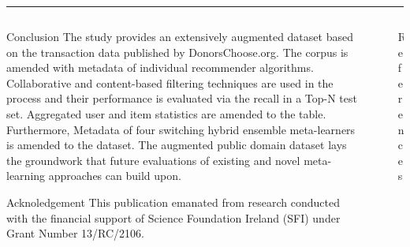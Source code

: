 \documentclass[final]{beamer}
\begin{document}
\begin{frame}[t,fragile=singleslide]{}
	\begin{columns}[t]
		\begin{column}{0.945\textwidth}
			\color{gray}
			\vspace{0.5em}
			\hrule{}
			\vspace{0.5em}
		\end{column}
	\end{columns}

	\begin{columns}[t]
		\begin{column}{0.45\textwidth}
			\begin{block}{Conclusion}
				The study provides an extensively augmented dataset based on the transaction data published by DonorsChoose.org. The corpus is amended with metadata of individual recommender algorithms. Collaborative and content-based filtering techniques are used in the process and their performance is evaluated via the recall in a Top-N test set. Aggregated user and item statistics are amended to the table. Furthermore, Metadata of four switching hybrid ensemble meta-learners is amended to the dataset. The augmented public domain dataset lays the groundwork that future evaluations of existing and novel meta-learning approaches can build upon.
			\end{block}

			\begin{block}{Acknoledgement}
				\footnotesize
				This publication emanated from research conducted with the financial support of Science Foundation Ireland (SFI) under Grant Number 13/RC/2106.
			\end{block}
		\end{column}

		{
			\color{gray}
			\hspace{-1em}
			\vrule{}
			\hspace{+1em}
		}

		\begin{column}{0.45\textwidth}
			\begin{block}{References}
				\printbibliography[heading=none]
			\end{block}
		\end{column}
	\end{columns}
\end{frame}
\end{document}
